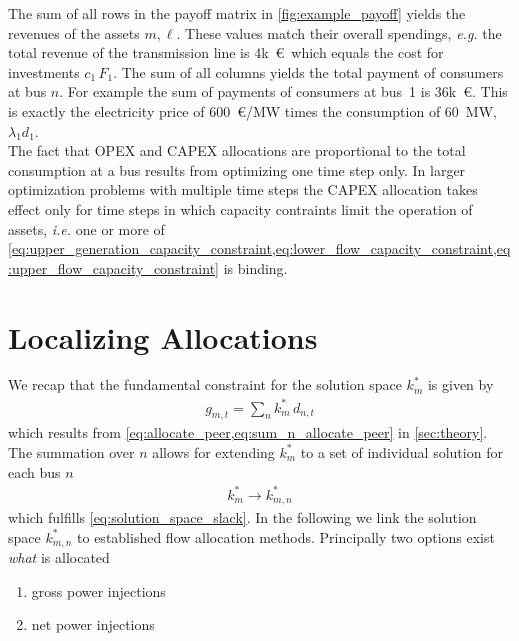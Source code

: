 \documentclass[11pt,twocolumn]{article}
\newcommand{\ie}{\textit{i.e.} }
\newcommand{\nodalgeneration}[1][n]{g_{#1,t}}
\newcommand{\nodaldemand}[1][n]{d_{#1,t}}
\newcommand{\slackk}[1][n]{k^*_{#1}}
\newcommand{\Slackk}{k^*_{m,n}}
\begin{document}
The sum of all rows in the payoff matrix in \cref{fig:example_payoff} yields the revenues of the assets $m, \ell$. These values match their overall spendings, \textit{e.g.} the total revenue of the transmission line is 4k~\euro\, which equals the cost for investments $c_{1}\,F_{1}$. The sum of all columns yields the total payment of consumers at bus $n$. For example the sum of payments of consumers at bus~1 is 36k~\euro. This is exactly the electricity price of 600~\euro/MW times the consumption of 60~MW, $\lambda_1 d_1$. \\

The fact that OPEX and CAPEX allocations are proportional to the total consumption at a bus results from optimizing one time step only. In larger optimization problems with multiple time steps the CAPEX allocation takes effect only for time steps in which capacity contraints limit the operation of assets, \ie one or more of  \cref{eq:upper_generation_capacity_constraint,eq:lower_flow_capacity_constraint,eq:upper_flow_capacity_constraint} is binding.  

\section{Localizing Allocations}
\label{sec:localizing_allocations}

We recap that the fundamental constraint for the solution space $\slackk[m]$ is given by 
\begin{align}
\nodalgeneration[m] = \sum_n \slackk[m] \, \nodaldemand  
\label{eq:solution_space_slack}
\end{align}
which results from \cref{eq:allocate_peer,eq:sum_n_allocate_peer} in \cref{sec:theory}. The summation over $n$ allows for extending $\slackk[m]$ to a set of individual solution for each bus $n$
\begin{align}
\slackk[m] \rightarrow \Slackk  
\end{align}
which fulfills \cref{eq:solution_space_slack}. In the following we link the solution space $\Slackk$ to established flow allocation methods. Principally two options exist \textit{what} is allocated 
\begin{enumerate}
\item gross power injections \label{gross}
\item net power injections \label{net}
\end{enumerate}
\end{document}
